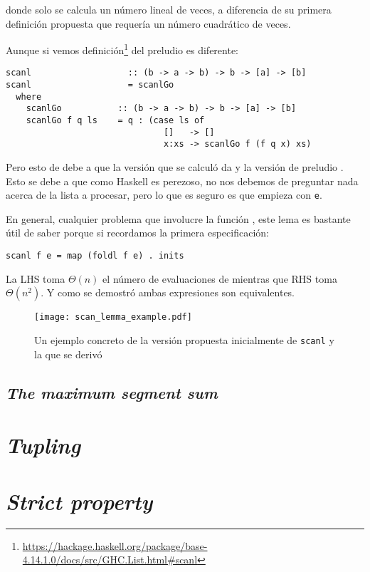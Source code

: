 donde  solo se calcula un número lineal de veces, a diferencia de su primera definición
propuesta que requería un número cuadrático de veces.

Aunque si vemos definición\footnote{
\url{https://hackage.haskell.org/package/base-4.14.1.0/docs/src/GHC.List.html\#scanl}
} del preludio es diferente:
\begin{verbatim}
scanl                   :: (b -> a -> b) -> b -> [a] -> [b]
scanl                   = scanlGo
  where
    scanlGo           :: (b -> a -> b) -> b -> [a] -> [b]
    scanlGo f q ls    = q : (case ls of
                               []   -> []
                               x:xs -> scanlGo f (f q x) xs)
\end{verbatim}

Pero esto de debe a que la versión que se calculó da  y la
versión de preludio . Esto se debe a que como Haskell
es perezoso, no nos debemos de preguntar nada acerca de la lista a procesar, pero lo que es seguro
es que empieza con \texttt{e}.

En general, cualquier problema que involucre la función , este lema es bastante útil
de saber porque si recordamos la primera especificación:
\begin{verbatim}
scanl f e = map (foldl f e) . inits
\end{verbatim}

La LHS toma $\Theta(n)$ el número de evaluaciones de  mientras que RHS toma $\Theta(n^2)$.
Y como se demostró ambas expresiones son equivalentes.

\begin{figure}[h]
\caption{Un ejemplo concreto de la versión propuesta inicialmente de \texttt{scanl} y la que se derivó}
\centering
\texttt{[image: scan\_lemma\_example.pdf]}
\end{figure}

\subsection{\textit{The maximum segment sum}}

\section{\textit{Tupling}}
\section{\textit{Strict property}}



